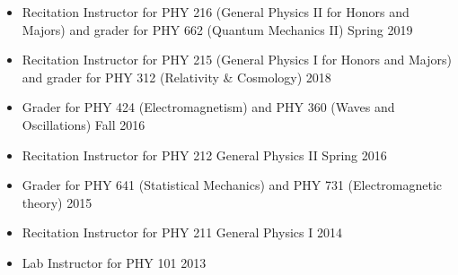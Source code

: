 
\begin{itemize}
 \item Recitation Instructor for PHY 216 (General Physics II for Honors and Majors) and grader for PHY 662 (Quantum Mechanics II)  \hfill Spring 2019 
 \item Recitation Instructor for PHY 215 (General Physics I for Honors and Majors) and grader for PHY 312 (Relativity \& Cosmology)   \hfill 2018 
 \item Grader for PHY 424 (Electromagnetism) and PHY 360 (Waves and Oscillations)  \hfill Fall 2016
 \item Recitation Instructor for PHY 212 General Physics II \hfill Spring 2016
 \item Grader for PHY 641 (Statistical Mechanics) and PHY 731 (Electromagnetic theory)  \hfill 2015 %
 \item Recitation Instructor for PHY 211 General Physics I \hfill 2014 %
 \item Lab Instructor for PHY 101  \hfill 2013
 \end{itemize}
